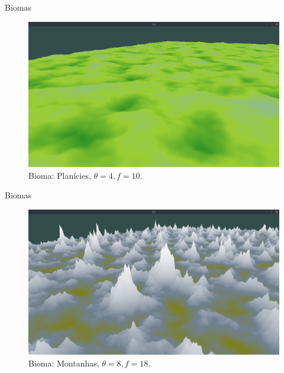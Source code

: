 \begin{frame}{Biomas}
    \begin{figure}[H]
        \centering
        \includegraphics[width=.9\textwidth]{img/biomas/bssPlains.png}
        \caption{Bioma: Planícies, $\theta = 4, f = 10 $.}
        \label{fig:img_biomas_bssPlains}
    \end{figure}
    
    
\end{frame}

\begin{frame}{Biomas}
    \begin{figure}[H]
        \centering
        \includegraphics[width=.9\textwidth]{img/biomas/bssMontains.png}
        \caption{Bioma: Montanhas, $\theta =  8, f = 18$.}
        \label{fig:img_biomas_bssMontains}
    \end{figure}
    
    
\end{frame}

